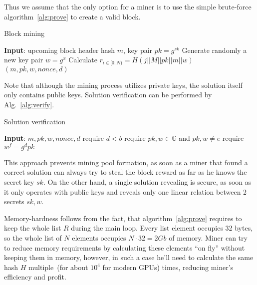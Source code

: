 Thus we assume that the only option for a miner is to use the simple brute-force algorithm~\ref{alg:prove} to
create a valid block.

\begin{algorithm}[H]
    \caption{Block mining}
    \label{alg:prove}
    \begin{algorithmic}[1]
        \State \textbf{Input}: upcoming block header hash $m$, key pair $pk=g^{sk}$
        \State Generate randomly a new key pair $w=g^x$
        \State Calculate $r_{i \in [0,N)}=H(j||M||pk||m||w)$
        \State \Return $(m,pk,w,nonce,d)$
        \EndIf
        \EndWhile
    \end{algorithmic}
\end{algorithm}

Note that although the mining process utilizes private keys, the solution itself
only contains public keys. Solution verification can be performed by Alg.~\ref{alg:verify}.

\begin{algorithm}[H]
    \caption{Solution verification}
    \label{alg:verify}
    \begin{algorithmic}[1]
        \State \textbf{Input}: $m,pk,w,nonce,d$
        \State require $d < b$
        \State require $pk,w\in \mathbb{G}$ and $pk,w \ne e$
        \State require $w^f = g^dpk$
    \end{algorithmic}
\end{algorithm}

This approach prevents mining pool formation, as soon as a miner that found a correct solution
can always try to steal the block reward as far as he knows the secret key $sk$. On the other hand,
a single solution revealing is secure, as soon as it only operates with public keys and reveals only one
linear relation between 2 secrets $sk,w$.

Memory-hardness follows from the fact, that algorithm~\ref{alg:prove} requires to keep
the whole list $R$ during the main loop.
Every list element occupies 32 bytes, so the whole list of $N$ elements
occupies $N \cdot 32 = 2 Gb$ of memory.
Miner can try to reduce memory requirements by calculating these elements ``on fly''
without keeping them in memory, however, in such a case he'll need to calculate the same
hash $H$ multiple~(for about $10^4$ for modern GPUs) times, reducing miner's efficiency and profit.

